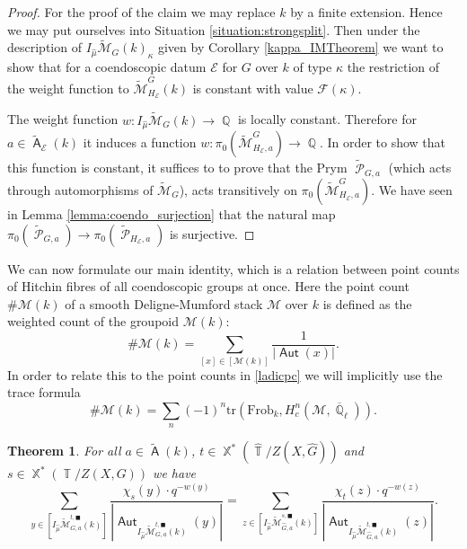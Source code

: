 \documentclass{article}
\DeclareMathOperator{\A}{\mathsf{A}}
\newcommand{\Ec}{\mathcal{E}}
\DeclareMathOperator{\Zb}{\mathbb{Z}}
\DeclareMathOperator{\Xb}{\mathbb{X}}
\DeclareMathOperator{\Aut}{\mathsf{Aut}}
\DeclareMathOperator{\Tb}{\mathbb{T}}
\newcommand{\Mc}{\mathcal{M}}
\DeclareMathOperator{\Pc}{\mathcal{P}}
\DeclareMathOperator{\Qb}{\mathbb{Q}}
\newcommand{\CE}{{\mathcal E}}
\newcommand{\CF}{{\mathcal F}}
\newcommand{\wmc}{\widetilde{\Mc} }
\newcommand{\wac}{\widetilde{\A} }
\theoremstyle{definition}
\theoremstyle{plain}
\newtheorem{theorem}[definition]{Theorem}
\begin{document}
\begin{proof}
For the proof of the claim we may replace $k$ by a finite extension. Hence we may put ourselves into Situation \ref{situation:strongsplit}. Then under the description of $I_{\widehat{\mu}}\widetilde{\Mc}_G(k)_\kappa$ given by Corollary \ref{kappa_IMTheorem} we want to show that for a coendoscopic datum $\CE$ for $G$ over $k$ of type $\kappa$ the restriction of the weight function to $\wmc_{H_\CE}^G(k)$ is constant with value $\CF(\kappa)$.

The weight function $w\colon I_{\widehat{\mu}}\widetilde{\Mc}_G(k) \to \Qb$ is locally constant. Therefore for $a \in \widetilde{\A}_{\Ec}(k)$ it induces a function $w\colon \pi_0(\widetilde{\Mc}_{H_{\Ec},a}^G) \to \Qb$. In order to show that this function is constant, it suffices to to prove that the Prym $\widetilde{\Pc}_{G,a}$ (which acts through automorphisms of $\widetilde{\Mc}_G$), acts transitively on $\pi_0(\widetilde{\Mc}^G_{H_{\Ec},a})$. We have seen in Lemma \ref{lemma:coendo_surjection} that the natural map $\pi_0(\widetilde{\Pc}_{G,a}) \to \pi_0(\widetilde{\Pc}_{H_{\Ec},a})$ is surjective.
\end{proof}

We can now formulate our main identity, which is a relation between point counts of Hitchin fibres of all coendoscopic groups at once. Here the point count $\# \Mc(k)$ of a smooth Deligne-Mumford stack $\Mc$ over $k$ is defined as the weighted count of the groupoid $\Mc(k)$:
\[ \# \Mc(k) = \sum_{[x] \in [ \Mc(k)]}  \frac{1}{|\Aut(x)|}.  \]
In order to relate this to the point counts in \eqref{ladicpc} we will implicitly use the trace formula \cite{Su12}
 \[\# \Mc(k) = \sum_n (-1)^n \mathrm{tr}\left(\text{Frob}_k,H_c^n(\Mc, \overline{\Qb}_\ell)\right).\]
  



\begin{theorem}\label{mainidentity} For all $a \in \wac(k)$, $t \in \Xb^*(\widehat{\Tb}/Z(X,\widehat{G}))$ and $s \in   \Xb^*(\Tb/Z(X,G))$ we have
\begin{equation}\label{mainsum} 
\sum_{y \in [I_{\widehat{\mu}} \wmc_{G,a}^{t,\blacksquare}(k)]} \frac{\chi_s(y)\cdot q^{-w(y)}}{|\Aut_{I_{\widehat{\mu}} \wmc_{G,a}^{t,\blacksquare}(k)}(y)|} = \sum_{z \in [I_{\widehat{\mu}} \wmc_{\widehat{G},a}^{s,\blacksquare}(k)]} \frac{\chi_t(z)\cdot q^{-w(z)}}{|\Aut_{I_{\widehat{\mu}} \wmc_{\widehat{G},a}^{t,\blacksquare}(k)}(z)|}.
\end{equation}
\end{theorem}
\end{document}
